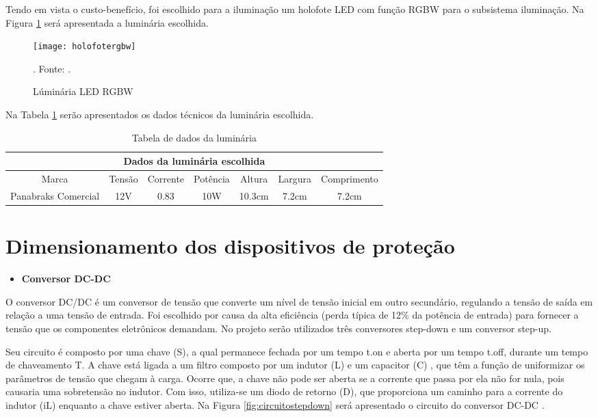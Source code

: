 Tendo em vista o custo-benefício, foi escolhido para a iluminação um holofote LED com função RGBW para o subsistema iluminação. Na Figura \ref{fig:holofotergbw} será apresentada a luminária escolhida.

    \begin{figure}[h!]
\centering
\texttt{[image: holofotergbw]}
\caption{Lúminária LED RGBW}. Fonte: \cite{holofote}.
\label{fig:holofotergbw}
\end{figure}
\vspace*{\fill}
\pagebreak

Na Tabela \ref{tab:luminaria} serão apresentados os dados técnicos da luminária escolhida.
    \begin{table}[H]
    \label{tab:luminaria}

\begin{tabular}{|c|c|c|c|c|c|c|}
\hline
\multicolumn{7}{|c|}{Dados da luminária escolhida}                                                 \\ \hline
Marca             & Tensão         & Corrente & Potência & Altura & Largura & Comprimento \\ \hline
Panabraks Comercial  & 12V  & 0.83          & 10W   & 10.3cm & 7.2cm & 7.2cm \\ \hline

\end{tabular}
    \caption{Tabela de dados da luminária}
\end{table}
\FloatBarrier

\section{Dimensionamento dos dispositivos de proteção}

\begin{itemize}
    \item \textbf{Conversor DC-DC}
\end{itemize}
O conversor DC/DC  é um conversor de tensão que converte um nível de tensão inicial em outro secundário, regulando a tensão de saída em relação a uma tensão de entrada. Foi escolhido por causa da alta eficiência (perda típica de 12\% da potência de entrada) para fornecer a tensão que os componentes eletrônicos demandam. No projeto serão utilizados três conversores step-down e um conversor step-up.
    
Seu circuito é composto por uma chave (S), a qual permanece fechada por um tempo t.on e aberta por um tempo t.off, durante um tempo de chaveamento T. A chave está ligada a um filtro composto por um indutor (L) e um capacitor (C) , que têm a função de uniformizar os parâmetros de tensão que chegam à carga. Ocorre que, a chave não pode ser aberta se a corrente que passa por ela não for nula, pois causaria uma sobretensão no indutor. Com isso, utiliza-se um diodo de retorno (D), que proporciona um caminho para a corrente do indutor (iL) enquanto a chave estiver aberta. Na Figura \ref{fig:circuitostepdown} será apresentado o circuito do conversor DC-DC \cite{Amauri}.

